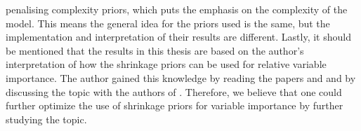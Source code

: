 penalising complexity priors, which puts the emphasis on the complexity of the model. This means the general idea for the priors used is the same, but the implementation and interpretation of their results are different. Lastly, it should be mentioned that the results in this thesis are based on the author's interpretation of how the shrinkage priors can be used for relative variable importance. The author gained this knowledge by reading the papers \citet{zhang2020bayesian} and \citet{aguilar2024generalized} and by discussing the topic with the authors of \citet{aguilar2024generalized}. Therefore, we believe that one could further optimize the use of shrinkage priors for variable importance by further studying the topic.
